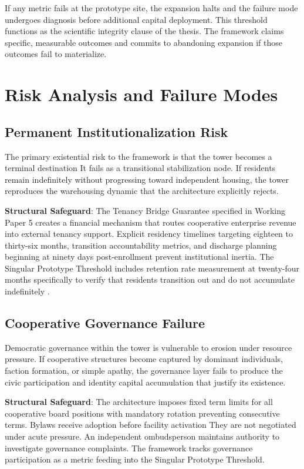\documentclass[12pt, letterpaper]{article}
\begin{document}
If any metric fails at the prototype site, the expansion halts and the failure mode undergoes diagnosis before additional capital deployment. This threshold functions as the scientific integrity clause of the thesis. The framework claims specific, measurable outcomes and commits to abandoning expansion if those outcomes fail to materialize.

\newpage
\section{Risk Analysis and Failure Modes}

\subsection{Permanent Institutionalization Risk}

The primary existential risk to the framework is that the tower becomes a terminal destination It fails as a transitional stabilization node. If residents remain indefinitely without progressing toward independent housing, the tower reproduces the warehousing dynamic that the architecture explicitly rejects.

\textbf{Structural Safeguard}: The Tenancy Bridge Guarantee specified in Working Paper 5 creates a financial mechanism that routes cooperative enterprise revenue into external tenancy support. Explicit residency timelines targeting eighteen to thirty-six months, transition accountability metrics, and discharge planning beginning at ninety days post-enrollment prevent institutional inertia. The Singular Prototype Threshold includes retention rate measurement at twenty-four months specifically to verify that residents transition out and do not accumulate indefinitely \citep{dibella_2026_wp5}.

\subsection{Cooperative Governance Failure}

Democratic governance within the tower is vulnerable to erosion under resource pressure. If cooperative structures become captured by dominant individuals, faction formation, or simple apathy, the governance layer fails to produce the civic participation and identity capital accumulation that justify its existence.

\textbf{Structural Safeguard}: The architecture imposes fixed term limits for all cooperative board positions with mandatory rotation preventing consecutive terms. Bylaws receive adoption before facility activation They are not negotiated under acute pressure. An independent ombudsperson maintains authority to investigate governance complaints. The framework tracks governance participation as a metric feeding into the Singular Prototype Threshold.
\end{document}
